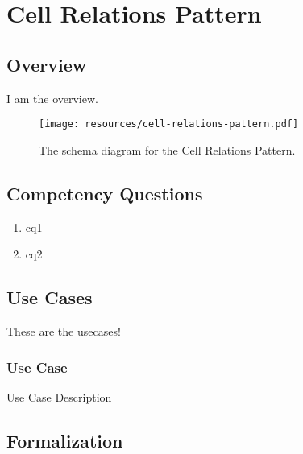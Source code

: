 
\section{Cell Relations Pattern}
\label{sec:cell-relations-pattern}
\subsection{Overview}
\label{ssec:overview}
I am the overview.

\begin{figure}[h!]
  \begin{center}
    \texttt{[image: resources/cell-relations-pattern.pdf]}
  \end{center}
  \caption{The schema diagram for the Cell Relations Pattern.}
  \label{fig:ov-diagram}
\end{figure}


\subsection{Competency Questions}
\label{ssec:cqs}
\begin{enumerate}[\phantom{CQ }CQ 1.]
	\item cq1
	\item cq2
\end{enumerate}

\subsection{Use Cases}
\label{ssec:use-cases}
These are the usecases!

\subsubsection{Use Case}
Use Case Description

\subsection{Formalization}
\label{ssec:formalization}
